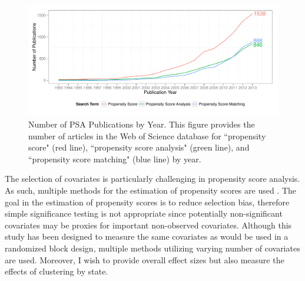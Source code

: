 \documentclass[letterpaper,12p,twoside]{article} %
\begin{document}
\setlength{\belowcaptionskip}{-10pt}
\begin{figure}[t]
\begin{center}
\includegraphics[width=.9\textwidth]{../Figures/PSACitations}
\caption[Number of PSA Publications by Year]{Number of PSA Publications by Year. This figure provides the number of articles in the Web of Science database for ``propensity score" (red line), ``propensity score analysis" (green line), and ``propensity score matching" (blue line) by year.}
\label{fig:PSApublications}
\end{center}
\end{figure}
\setlength{\belowcaptionskip}{0pt}

The selection of covariates is particularly challenging in propensity score analysis. As such, multiple methods for the estimation of propensity scores are used \cite{Rosenbaum2012}. The goal in the estimation of propensity scores is to reduce selection bias, therefore simple significance testing is not appropriate \cite{Rosenbaum2002,Rosenbaum2010} since potentially non-significant covariates may be proxies for important non-observed covariates. Although this study has been designed to measure the same covariates as would be used in a randomized block design, multiple methods utilizing varying number of covariates are used. Moreover, I wish to provide overall effect sizes but also measure the effects of clustering by state. 
\end{document}
